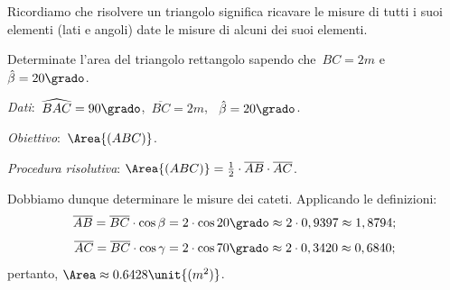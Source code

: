 Ricordiamo che risolvere un triangolo significa ricavare le misure di tutti i 
suoi elementi (lati e angoli) date le misure di alcuni dei suoi elementi.

 \begin{esempio}
Determinate l'area del triangolo rettangolo sapendo che~${BC}=2\unit{m}$ 
e~$\hat{\beta} =20\grado$.

\emph{Dati}:~$\widehat{BAC}=90\grado$,\quad~$\overline{BC}=2\unit{m}$,
\quad~$\hat{\beta}=20\grado$.

\emph{Obiettivo}:~$\Area{(ABC)}$.

\emph{Procedura risolutiva}:
$\Area{(ABC)}=\frac{1}{2}\cdot \overline{AB}\cdot \overline{AC}$.

Dobbiamo dunque determinare le misure dei cateti. Applicando le definizioni:
\[\overline{AB}=\overline{BC}\cdot {\cos \beta}=2\cdot 
{\cos 20\grado} \approx2\cdot 0,9397\approx1,8794;\]
\[\overline{AC}=\overline{BC}\cdot {\cos \gamma}=2\cdot 
{\cos 70\grado} \approx2\cdot 0,3420\approx0,6840;\]
pertanto, $\Area\approx0.6428\unit{(m^{2})}$.
 \end{esempio}


